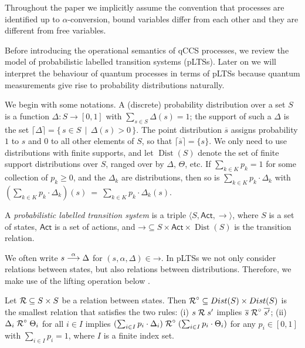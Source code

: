 \documentclass[runningheads]{llncs}
\newcommand{\dist}[1]{\mathop{Dist} ({#1})   } %
\newcommand{\pdist}[1]{\overline{#1}  } %
\newcommand{\support}[1]{\lceil{#1}\rceil}
\newcommand{\lift}[1]{\mathrel{{#1}^\circ}}
\newcommand{\Act}{\ensuremath{\mathsf{Act}}\xspace}
\newcommand{\setof}[2]{\{ \, #1 \, \mid \, #2 \, \}}%
\begin{document}
Throughout the paper we implicitly assume the convention that processes are identified up to $\alpha$-conversion, bound variables differ from each other and they are different from free variables.

Before introducing the operational semantics of qCCS processes, we review the model of probabilistic labelled
transition systems (pLTSs). Later on we will interpret the behaviour
of quantum processes in terms of pLTSs because quantum measurements give rise to probability distributions naturally.

We begin with some notations. A (discrete) probability distribution
over a set $S$ is a function $\Delta \colon S \rightarrow [0, 1] $ with
$\sum_{s\in S} \Delta(s) = 1$; the support of such a $\Delta$ is
the set $\support{\Delta} = \setof{s \in S}{\Delta(s) > 0}$.
The point distribution $\pdist{s}$ assigns probability
$1$ to $s$ and $0$ to all other elements of $S$, so that
$\support{\pdist{s}} = \{s\}$. We only need to use distributions with finite supports, and let $\dist{S}$ denote the set of
finite support distributions over $S$, ranged over by $\Delta$, $\Theta$, etc.
If $\sum_{k \in K} p_k = 1$ for some
collection of  $p_k \geq 0$, and the $\Delta_k$ are distributions,
then so is $\sum_{k \in K}p_k \cdot \Delta_k$ with
$(\sum_{k \in K}p_k \cdot \Delta_k)(s)~=~\sum_{k\in K} p_k\cdot \Delta_k(s).$


\begin{definition}\label{def:LTS}
	A \emph{probabilistic labelled transition system}
	is a triple
	$\langle S, \Act,  \rightarrow  \rangle$, where
	$S$ is a set of states,
	$\Act$ is a set of actions, and $\mathord{\rightarrow} \subseteq
	S \times \Act \times \dist{S}$ is the transition relation.
\end{definition}

We often write $s\mathrel{\stackrel{\alpha}{\longrightarrow}}\Delta$ for $(s,\alpha,\Delta)\in\mathord{\rightarrow}$. %
In pLTSs we not only consider relations between states, but also relations between distributions. Therefore, we make use of the lifting operation below \cite{Deng15}.
\begin{definition}\label{def:lift}
	Let $\mathord{\mathrel{{\mathcal R }}} \subseteq
	S\times S$ be a relation between states.
	Then $\mathord{\lift{\aRel}} \subseteq \dist{S} \times
	\dist{S}$ is the smallest relation that satisfies the two rules:
	(i) $s \mathrel{{\mathcal R }} s'$ implies $\pdist{s} \lift{\aRel} \pdist{s'}$;
	(ii) $\Delta_i \lift{\aRel} \Theta_i$ for all $i\in I$ implies
	$(\sum_{i\in I}p_i\cdot\Delta_i)\lift{\aRel}(\sum_{i\in I}p_i\cdot\Theta_i)$
	for any $p_i \in [0,1]$ with $\sum_{i\in I}p_i = 1$, where $I$ is a
	finite index set.
\end{definition}
\end{document}
